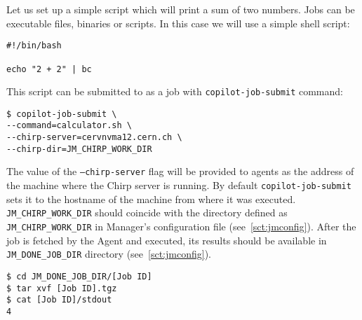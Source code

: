 Let us set up a simple script which will print a sum of two numbers. Jobs can be executable files, binaries or scripts. In this case we will use a simple shell script:

\begin{lstlisting}
#!/bin/bash

echo "2 + 2" | bc
\end{lstlisting}

This script can be submitted to \copilot as a job with \texttt{copilot-job-submit} command:
\lstset{caption=Submitting a job}
\begin{lstlisting}
$ copilot-job-submit \
--command=calculator.sh \
--chirp-server=cervnvma12.cern.ch \
--chirp-dir=JM_CHIRP_WORK_DIR
\end{lstlisting}

The value of the \texttt{--chirp-server} flag will be provided to agents as the address of the machine where the Chirp server is running. By default \texttt{copilot-job-submit} sets it to the hostname of the machine from where it was executed.
\texttt{JM\_CHIRP\_WORK\_DIR} should coincide with the directory defined as \texttt{JM\_CHIRP\_WORK\_DIR} in Manager's configuration file (see~\ref{sct:jmconfig}). After the job is fetched by the \copilot Agent and executed, its results should be available in \texttt{JM\_DONE\_JOB\_DIR} directory (see~\ref{sct:jmconfig}).


\lstset{caption=Inspecting job results}
\begin{lstlisting}
$ cd JM_DONE_JOB_DIR/[Job ID]
$ tar xvf [Job ID].tgz
$ cat [Job ID]/stdout
4
\end{lstlisting}

